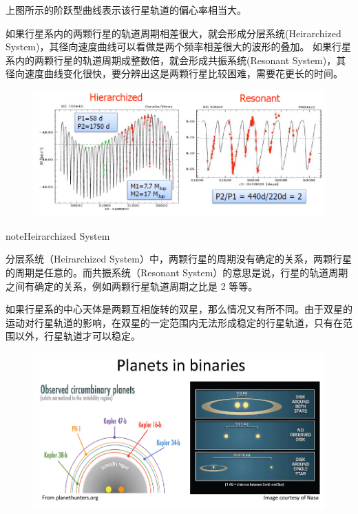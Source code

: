 \documentclass[letterpaper,10pt,english]{sphinxmanual}
\begin{document}
上图所示的阶跃型曲线表示该行星轨道的偏心率相当大。

如果行星系内的两颗行星的轨道周期相差很大，就会形成分层系统(Heirarchized System)，其径向速度曲线可以看做是两个频率相差很大的波形的叠加。
如果行星系内的两颗行星的轨道周期成整数倍，就会形成共振系统(Resonant System)，其径向速度曲线变化很快，要分辨出这是两颗行星比较困难，需要花更长的时间。
\begin{figure}[htbp]
\centering

\includegraphics{different_curves.jpg}
\end{figure}

\begin{notice}{note}{Heirarchized System}

分层系统（Heirarchized System）中，两颗行星的周期没有确定的关系，两颗行星的周期是任意的。而共振系统（Resonant System）的意思是说，行星的轨道周期之间有确定的关系，例如两颗行星轨道周期之比是 2 等等。
\end{notice}

如果行星系的中心天体是两颗互相旋转的双星，那么情况又有所不同。由于双星的运动对行星轨道的影响，在双星的一定范围内无法形成稳定的行星轨道，只有在范围以外，行星轨道才可以稳定。
\begin{figure}[htbp]
\centering

\includegraphics{Planets_in_binaries.jpg}
\end{figure}
\end{document}
